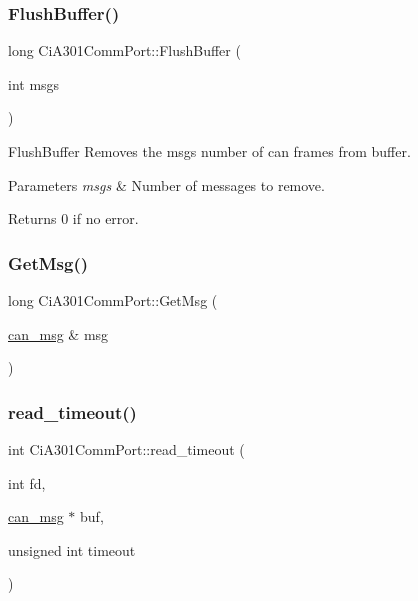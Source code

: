 \subsubsection{\texorpdfstring{Flush\+Buffer()}{FlushBuffer()}\hspace{0.1cm}{\footnotesize\ttfamily [2/2]}}
{\footnotesize\ttfamily long Ci\+A301\+Comm\+Port\+::\+Flush\+Buffer (\begin{DoxyParamCaption}\item[{int}]{msgs }\end{DoxyParamCaption})}



Flush\+Buffer Removes the msgs number of can frames from buffer. 


\begin{DoxyParams}{Parameters}
{\em msgs} & Number of messages to remove. \\
\hline
\end{DoxyParams}
\begin{DoxyReturn}{Returns}
0 if no error. 
\end{DoxyReturn}
\mbox{\label{classCiA301CommPort_a645450ca09e07ea6da339923ceeec934}} 
\subsubsection{\texorpdfstring{Get\+Msg()}{GetMsg()}}
{\footnotesize\ttfamily long Ci\+A301\+Comm\+Port\+::\+Get\+Msg (\begin{DoxyParamCaption}\item[{\hyperlink{structcan__msg}{can\+\_\+msg} \&}]{msg }\end{DoxyParamCaption})\hspace{0.3cm}{\ttfamily [private]}}

\mbox{\label{classCiA301CommPort_ae62c2389b38a0e217aff7ca17a3d87b6}} 
\subsubsection{\texorpdfstring{read\+\_\+timeout()}{read\_timeout()}}
{\footnotesize\ttfamily int Ci\+A301\+Comm\+Port\+::read\+\_\+timeout (\begin{DoxyParamCaption}\item[{int}]{fd,  }\item[{\hyperlink{structcan__msg}{can\+\_\+msg} $\ast$}]{buf,  }\item[{unsigned int}]{timeout }\end{DoxyParamCaption})\hspace{0.3cm}{\ttfamily [private]}}

